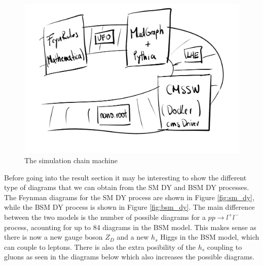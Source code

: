 \documentclass{CUP-JNL-DTM}%
\theoremstyle{definition}
\numberwithin{equation}{section}
\begin{document}
\begin{figure}[H]
  \centering
  \includegraphics[width=0.85\linewidth]{img/chain.png}
  \caption{The simulation chain machine}
  \label{fig:chain}
\end{figure}

Before going into the result section it may be interesting to show the different type of diagrams that we can obtain from the SM DY and BSM DY processes. The Feynman diagrams for the SM DY process are shown in Figure \ref{fig:sm_dy}, while the BSM DY process is shown in Figure \ref{fig:bsm_dy}. The main difference between the two models is the number of possible diagrams for a $p p \rightarrow l^+ l^-$ process, acounting for up to 84 diagrams in the BSM model. This makes sense as there is now a new gauge boson $Z_D$ and a new $h_s$ Higgs in the BSM model, which can couple to leptons. There is also the extra posibility of the $h_s$ coupling to gluons as seen in the diagrams below which also increases the possible diagrams.
\end{document}
